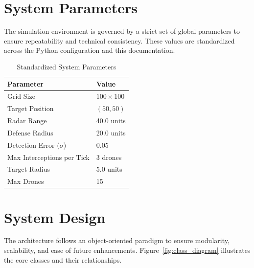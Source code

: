 \documentclass[11pt,a4paper]{article}
\begin{document}
\section{System Parameters}
The simulation environment is governed by a strict set of global parameters to ensure repeatability and technical consistency. These values are standardized across the Python configuration and this documentation.

\begin{table}[htbp]
    \centering
    \caption{Standardized System Parameters}
    \label{tab:params}
    \begin{tabular}{|l|l|}
        \hline
        \textbf{Parameter} & \textbf{Value} \\
        \hline
        Grid Size & $100 \times 100$ \\
        Target Position & $(50, 50)$ \\
        Radar Range & 40.0 units \\
        Defense Radius & 20.0 units \\
        Detection Error ($\sigma$) & 0.05 \\
        Max Interceptions per Tick & 3 drones \\
        Target Radius & 5.0 units \\
        Max Drones & 15 \\
        \hline
    \end{tabular}
\end{table}

\section{System Design}
The architecture follows an object-oriented paradigm to ensure modularity, scalability, and ease of future enhancements. Figure~\ref{fig:class_diagram} illustrates the core classes and their relationships.

\end{document}
